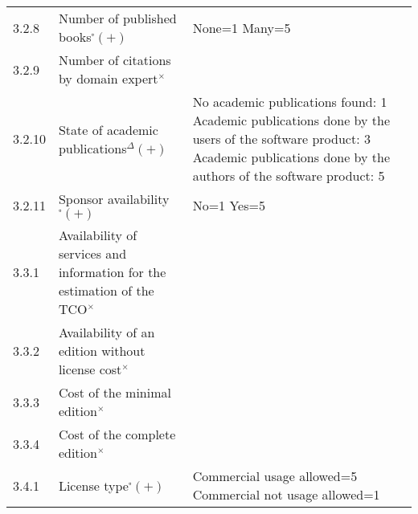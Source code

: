 \begin{longtable}[]{|p{1cm}p{6cm}p{6cm}|}
3.2.8 & Number of published books$^{\square}(+)$ & None=1 Many=5 \\
3.2.9 & Number of citations by domain expert$^{\times}$ & \\
3.2.10 & State of academic publications$^{\Delta}(+)$ & No academic
publications found: 1 Academic publications done by the users of the
software product: 3 Academic publications done by the authors of the
software product: 5 \\
3.2.11 & Sponsor availability$^{\square}(+)$ & No=1 Yes=5 \\
3.3.1 & Availability of services and information for the estimation of
the TCO$^{\times}$ & \\
3.3.2 & Availability of an edition without license cost$^{\times}$ & \\
3.3.3 & Cost of the minimal edition$^{\times}$ & \\
3.3.4 & Cost of the complete edition$^{\times}$ & \\
3.4.1 & License type$^{\square}(+)$ & Commercial usage allowed=5 Commercial not usage
allowed=1 \\
\bottomrule
\end{longtable}